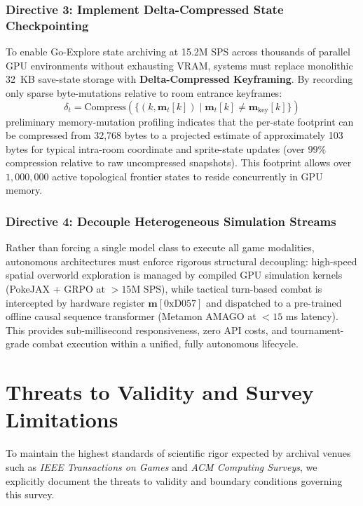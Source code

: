 \documentclass[journal,10pt,twocolumn]{IEEEtran}
\begin{document}
\subsubsection{Directive 3: Implement Delta-Compressed State Checkpointing}
To enable Go-Explore state archiving at 15.2M SPS across thousands of parallel GPU environments without exhausting VRAM, systems must replace monolithic 32~KB save-state storage with \textbf{Delta-Compressed Keyframing}. By recording only sparse byte-mutations relative to room entrance keyframes:
\begin{equation}
\delta_t = \text{Compress}\left( \{ (k, \mathbf{m}_t[k]) \mid \mathbf{m}_t[k] \ne \mathbf{m}_{\text{key}}[k] \} \right)
\end{equation}
preliminary memory-mutation profiling indicates that the per-state footprint can be compressed from 32,768 bytes to a projected estimate of approximately 103 bytes for typical intra-room coordinate and sprite-state updates (over $99\%$ compression relative to raw uncompressed snapshots). This footprint allows over $1{,}000{,}000$ active topological frontier states to reside concurrently in GPU memory.

\subsubsection{Directive 4: Decouple Heterogeneous Simulation Streams}
Rather than forcing a single model class to execute all game modalities, autonomous architectures must enforce rigorous structural decoupling: high-speed spatial overworld exploration is managed by compiled GPU simulation kernels (PokeJAX + GRPO at $>15$M SPS), while tactical turn-based combat is intercepted by hardware register $\mathbf{m}[\text{0xD057}]$ and dispatched to a pre-trained offline causal sequence transformer (Metamon AMAGO at $<15$ ms latency). This provides sub-millisecond responsiveness, zero API costs, and tournament-grade combat execution within a unified, fully autonomous lifecycle.

\section{Threats to Validity and Survey Limitations}
\label{sec:threats}
To maintain the highest standards of scientific rigor expected by archival venues such as \textit{IEEE Transactions on Games} and \textit{ACM Computing Surveys}, we explicitly document the threats to validity and boundary conditions governing this survey.
\end{document}
